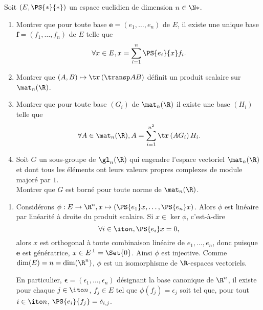 \begin{enonce}
\begin{exercise}[ID={RMS 116-4 E938, Centrale PC 2005},subtitle={},tags={}]
Soit $\left( E,\PS{*}{*} \right)$ un espace euclidien de dimension $n\in\N*$.
\begin{enumerate}
\item 
  Montrer que pour toute base $\bm e=\left( e_1,\dotsc,e_n \right)$ de $E$, il existe une unique base $\bm f=\left( f_1,\dotsc,f_n \right)$ de $E$ telle que
  \begin{equation}
    \forall x\in E, x=\sum_{i=1}^n \PS{e_i}{x} f_i.
  \end{equation}
\item Montrer que $(A,B)\mapsto \tr\left( \transp AB \right)$ définit un produit scalaire sur $\mat_n(\R)$.
\item Montrer que pour toute base $\left( G_i \right)$ de $\mat_n(\R)$ il existe une base $(H_i)$ telle que
  \begin{equation}
    \forall A\in\mat_n(\R), A= \sum_{i=1}^{n^2} \tr\left( A G_i \right) H_i.
  \end{equation}
\item
  Soit $G$ un sous-groupe de $\gl_n(\R)$ qui engendre l'espace vectoriel  $\mat_n(\R)$ et dont tous les éléments ont leurs valeurs propres complexes de module majoré par $1$.\\
  Montrer que $G$ est borné pour toute norme de $\mat_n(\R)$.
\end{enumerate}
\end{exercise}
\begin{solution}
\begin{enumerate}
\item 
  Considérons $\phi:E\to\R^n, x\mapsto\left( \PS{e_1}x,\dotsc,\PS{e_n}x \right)$.
  Alors $\phi$ est linéaire par linéarité à droite du produit scalaire.
  Si $x\in\ker\phi$, c'est-à-dire 
  \begin{equation*}
    \forall i\in\ito n, \PS{e_i}x=0,
  \end{equation*}
  alors $x$ est orthogonal à toute combinaison linéaire de $e_1,\dotsc,e_n$, donc puisque $\bm e$ est génératrice, $x\in E^\perp=\Set{0}$.
  Ainsi $\phi$ est injective.
  Comme $\dim(E)=n=\dim(\R^n)$, $\phi$ est un isomorphisme de $\R$-espaces vectoriels.

  En particulier, $\bm\epsilon=\left( \epsilon_1,\dotsc,\epsilon_n \right)$ désignant la base canonique de $\R^n$, il existe pour chaque $j\in\ito n$, $f_j\in E$ tel que $\phi(f_j)=\epsilon_j$ soit tel que, pour tout $i\in\ito n$, $\PS{e_i}{f_j}=\delta_{i,j}$.


\end{enumerate}
\end{solution}
\end{enonce}
